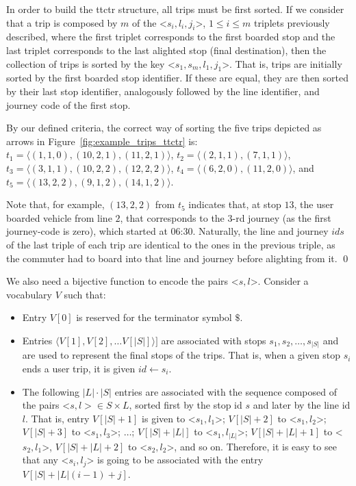     In order to build the \gls{ttctr} structure, all trips must be first sorted. If we consider that a trip is composed by $m$ of the <$s_i,l_i,j_i$>, $1\leq i\leq m$ triplets previously described, where the first triplet corresponds to the first boarded stop and the last triplet corresponds to the last alighted stop (final destination), then the collection of trips is sorted by the key <$s_1,s_m,l_1,j_1$>. That is, trips are initially sorted by the first boarded stop identifier. If these are equal, they are then sorted by their last stop identifier, analogously followed by the line identifier, and journey code of the first stop. 
    
    \medskip
    \begin{example}
    	By our defined criteria, the correct way of sorting the five trips depicted as arrows in Figure~\ref{fig:example_trips_ttctr} is: 
    	$t_1 = \langle (1,1,0), (10,2,1), (11,2,1)  \rangle$, 
    	$t_2 = \langle (2,1,1), (7,1,1) \rangle$, 
    	$t_3 = \langle (3,1,1), (10,2,2), (12,2,2) \rangle$, 
    	$t_4 = \langle (6,2,0),(11,2,0) \rangle$, and %
    	$t_5 = \langle (13,2,2), (9,1,2), (14,1,2) \rangle$.  
    	
    	Note that, for example, $(13,2,2)$ from $t_5$ indicates that, at stop $13$, the user boarded vehicle from line $2$, that corresponds to the $3$-rd journey (as the first journey-code is zero), which started at 06:30. %
    	Naturally, the line and journey $ids$ of the last triple of each trip are identical to the ones in the previous triple, as the commuter had to board into that line and journey before alighting from it.
    	\qed \label{ex:trips}
    \end{example}
    
    \medskip
    We also need a bijective function to encode the pairs <$s,l$>. Consider a vocabulary $V$ such that:
    \begin{itemize}
    	\item Entry $V[0]$ is reserved for the terminator symbol $\$$.
    	\item Entries $\langle V[1],V[2], \dots V[|S|]\rangle]$ are associated with stops $s_1,s_2,\dots, s_{|S|}$ and are used to represent the final stops of the trips. That is, when a given stop $s_i$ ends a user trip, it is given $id \leftarrow s_i$.
    	\item The following $|L|\cdot|S|$ entries are associated with the sequence composed of the pairs <$s,l> \in S\times L$, sorted first by the stop id $s$ and later by the line id $l$. That is, entry $V[|S|+1]$ is given to <$s_1,l_1$>; $V[|S|+2]$ to <$s_1,l_2$>; $V[|S|+3]$ to <$s_1,l_3$>; $\dots$; $V[|S|+|L|]$ to <$s_1,l_{|L|}$>;  $V[|S|+|L|+1]$ to <$s_2, l_1$>, $V[|S|+|L|+2]$ to <$s_2, l_2$>, and so on. Therefore, it is easy to see that any <$s_i,l_j$> is going to be associated with the entry $V[|S|+ |L|(i-1) + j]$.
    \end{itemize}
    
